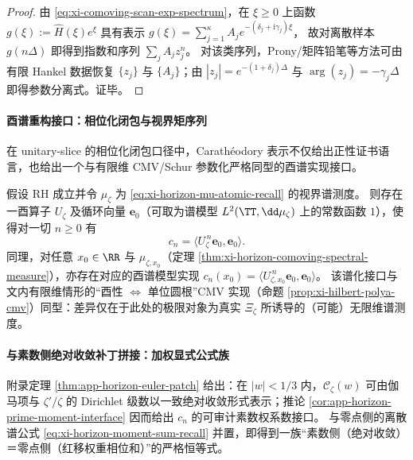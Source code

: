 \begin{proof}
由 \eqref{eq:xi-comoving-scan-exp-spectrum}，在 \(\xi\ge 0\) 上函数 \(g(\xi):=\widehat H(\xi)e^{\xi}\) 具有表示
\(
g(\xi)=\sum_{j=1}^{\kappa}A_j e^{-(\delta_j+\mathrm{i}\gamma_j)\xi}
\)，
故对离散样本 \(g(n\Delta)\) 即得到指数和序列 \(\sum_j A_j z_j^n\)。
对该类序列，Prony/矩阵铅笔等方法可由有限 Hankel 数据恢复 \(\{z_j\}\) 与 \(\{A_j\}\)；由 \(|z_j|=e^{-(1+\delta_j)\Delta}\) 与 \(\arg(z_j)=-\gamma_j\Delta\) 即得参数分离式。证毕。
\end{proof}



\paragraph{酉谱重构接口：相位化闭包与视界矩序列}
在 unitary-slice 的相位化闭包口径中，Carath\'eodory 表示不仅给出正性证书语言，也给出一个与有限维 CMV/Schur 参数化严格同型的酉谱实现接口。

\begin{corollary}\label{cor:xi-horizon-unitary-spectral-realization}
假设 RH 成立并令 \(\mu_{\zeta}\) 为 \eqref{eq:xi-horizon-mu-atomic-recall} 的视界谱测度。
则存在一酉算子 \(U_{\zeta}\) 及循环向量 \(\mathbf{e}_0\)（可取为谱模型 \(L^2(\TT,\dd\mu_{\zeta})\) 上的常数函数 \(1\)），使得对一切 \(n\ge 0\) 有
\begin{equation}\label{eq:xi-horizon-unitary-moments}
\boxed{\;
c_n=\langle U_{\zeta}^{\,n}\mathbf{e}_0,\mathbf{e}_0\rangle. \;}
\end{equation}
同理，对任意 \(x_0\in\RR\) 与 \(\mu_{\zeta,x_0}\)（定理 \ref{thm:xi-horizon-comoving-spectral-measure}），亦存在对应的酉谱模型实现 \(c_n(x_0)=\langle U_{\zeta,x_0}^{\,n}\mathbf{e}_0,\mathbf{e}_0\rangle\)。
该谱化接口与文内有限维情形的“酉性 \(\Leftrightarrow\) 单位圆根”CMV 实现（命题 \ref{prop:xi-hilbert-polya-cmv}）同型：差异仅在于此处的极限对象为真实 \(\Xi_{\zeta}\) 所诱导的（可能）无限维谱测度。
\end{corollary}

\paragraph{与素数侧绝对收敛补丁拼接：加权显式公式族}
附录定理 \ref{thm:app-horizon-euler-patch} 给出：在 \(|w|<1/3\) 内，\(\mathscr{C}_{\zeta}(w)\) 可由伽马项与 \(\zeta'/\zeta\) 的 Dirichlet 级数以一致绝对收敛形式表示；推论 \ref{cor:app-horizon-prime-moment-interface} 因而给出 \(c_n\) 的可审计素数权系数接口。
与零点侧的离散谱公式 \eqref{eq:xi-horizon-moment-sum-recall} 并置，即得到一族“素数侧（绝对收敛）＝零点侧（红移权重相位和）”的严格恒等式。

